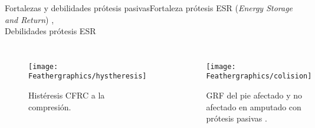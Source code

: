 \documentclass[10pt]{beamer}
\begin{document}
\begin{frame}{Fortalezas y debilidades prótesis pasivas}{Fortaleza prótesis ESR (\textit{Energy Storage and Return}) \cite{Zelik2014}, \\ Debilidades prótesis ESR \cite{Varol2010,Weber2014,Au2008,Morgenroth2011,Martinez-Villalpando2009,Esposito2015,DeAsha2014}}

\begin{columns}[t]

\column{55 mm}

\begin{figure}
\begin{centering}
\texttt{[image: Feathergraphics/hystheresis]}
\par\end{centering}
\caption{\footnotesize{Histéresis CFRC a la compresión.\cite{Nolan2008}}}
\end{figure}

\column{50 mm}


\begin{figure}
\begin{centering}
\texttt{[image: Feathergraphics/colision]}
\caption{\footnotesize{GRF del pie afectado y no afectado en amputado con prótesis pasivas \cite{Morgenroth2011}.}}
\end{centering}
\end{figure}

\end{columns}

\end{frame}
\end{document}
